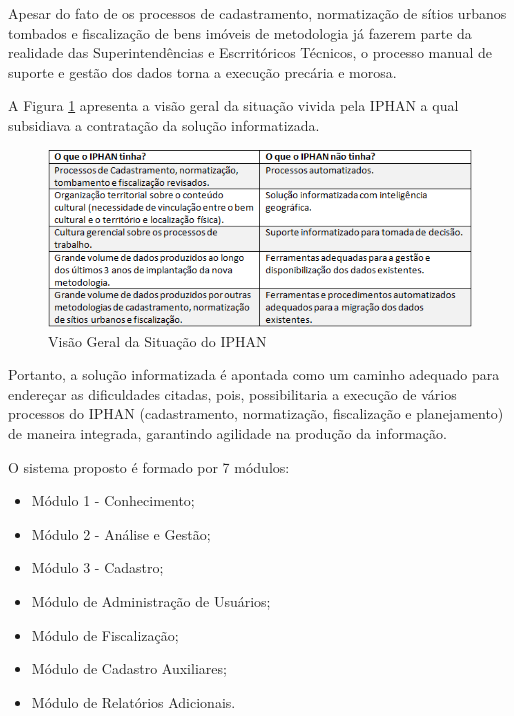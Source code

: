 Apesar do fato de os processos de cadastramento, normatização de sítios urbanos tombados e fiscalização de bens imóveis de metodologia já fazerem parte da realidade das Superintendências e Escrritóricos Técnicos, o processo manual de suporte e gestão dos dados torna a execução precária e morosa.

A Figura \ref{problemas}  apresenta a visão geral da situação vivida pela IPHAN a qual subsidiava a contratação da solução informatizada.

\begin{figure}[H]
		\centering
			\includegraphics[scale=1.0]{figuras/problemas.png}
		\caption{Visão Geral da Situação do IPHAN}
		\label{problemas}
\end{figure}

\textcolor{red}{}

Portanto, a solução informatizada é apontada como um caminho adequado para endereçar as dificuldades citadas, pois, possibilitaria a execução de vários processos do IPHAN (cadastramento, normatização, fiscalização e planejamento) de maneira integrada, garantindo agilidade na produção da informação. 

O sistema proposto é formado por 7 módulos:

\begin{itemize}
\item Módulo 1 - Conhecimento;
\item Módulo 2 - Análise e Gestão;
\item Módulo 3 - Cadastro;
\item Módulo de Administração de Usuários;
\item Módulo de Fiscalização;
\item Módulo de Cadastro Auxiliares;
\item Módulo de Relatórios Adicionais.
\end{itemize}


